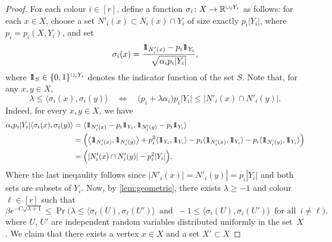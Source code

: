 \begin{proof}

  For each colour \(i \in [r]\), define a function \(\sigma_i \colon X \to \R^{\cup_i Y_i}\) as follows: for each \(x \in X\), choose a set \(N'_i(x) \subset N_i(x) \cap Y_i\) of size exactly \(p_i|Y_i|\), where \(p_i = p_i(X,Y_i)\), and set
  \begin{equation*}
    \sigma_i(x) = \frac{\id_{N'_i(x)} - p_i\id_{Y_i}}{\sqrt{\alpha_ip_i|Y_i|}},
  \end{equation*}
  where \(\id_S \in \{0,1\}^{\cup_i Y_i}\) denotes the indicator function of the set \(S\). Note that, for any \(x,y\in X\),
  \begin{equation*}
    \lambda \le \big\langle \sigma_i(x),\sigma_i(y) \big\rangle \quad \Leftrightarrow \quad \big( p_i + \lambda\alpha_i \big) p_i |Y_i| \le |N'_i(x) \cap N'_i(y)|.
  \end{equation*}
  Indeed, for every \(x,y\in X\), we have 
  \begin{multline}
    \begin{aligned}
            \alpha_ip_i|Y_i| \langle \sigma_i(x),\sigma_i(y) \rangle &= \langle \id_{N'_i(x)}- p_i\id_{Y_i},\id_{N'_i(y)}- p_i\id_{Y_i}\rangle\\
            &= \Bigl(\big\langle \id_{N'_i(x)},\id_{N'_i(y)}\big\rangle +p_i^2\langle \id_{Y_i},
            \id_{Y_i}\rangle - p_i \langle \id_{N'_i(x)},\id_{Y_i}\rangle- p_i \langle \id_{N'_i(y)},\id_{Y_i}\rangle\Bigr)\\
            &= \Bigl(|N'_i(x) \cap N'_i(y)|-p_i^2|Y_i| \Bigr),
    \end{aligned}
  \end{multline}
  Where the last ineqaulity follows since \(|N'_i(x)|= N'_i(y)|= p_i|Y_i|\) and both sets are subsets of \(Y_i\).
  Now, by \autoref{lem:geometric}, there exists \(\lambda \ge -1\) and colour \(\ell \in [r]\) such that
  \begin{equation}
    \label{eq: geometric-app}
    \beta e^{- C\sqrt{\lambda + 1}} \le \Pr\Big( \lambda  \le \big\langle \sigma_\ell(U),\sigma_\ell(U') \big\rangle \, \text{ and } \, -1 \le \big\langle \sigma_i(U), \sigma_i(U') \big\rangle \, \text{ for all } \, i \ne \ell \Big) .
  \end{equation}
  where \(U\), \(U'\) are independent random variables distributed uniformly in the set~\(X\). We claim that there exists a vertex \(x \in X\) and a set \(X' \subset X\)

\end{proof}
